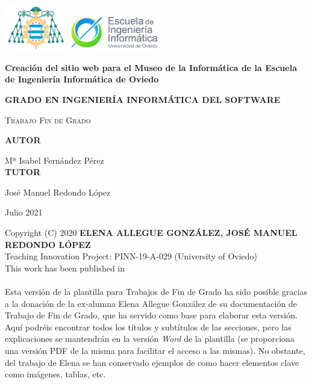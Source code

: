 \documentclass[11pt]{report}
\begin{document}

\hypersetup{pageanchor=false}
\begin{titlepage}
	\centering
	\includegraphics[width=0.2\textwidth]{EscudoUniovi}
	\hspace{3 cm}
	\includegraphics[width=0.3\textwidth]{EscudoEscuela}
	\par\vspace{1cm}
	
	\vspace{1.5cm}
	{\huge\bfseries Creación del sitio web para el Museo de la Informática de la Escuela de Ingeniería Informática de Oviedo\par}
	\vspace{2cm}
	{\large \textbf{GRADO EN INGENIERÍA INFORMÁTICA DEL SOFTWARE} \par}
	\vspace{1cm}
	{\scshape\Large Trabajo Fin de Grado\par}
   	
  \vspace{2cm}
	\textbf{AUTOR}\par
	 Mª Isabel Fernández Pérez \\
	\vspace{1.5cm}
	\textbf{TUTOR}\par
	José Manuel Redondo López
	\vfill
	
	{\large Julio 2021 \par}
\end{titlepage}


\newpage
Copyright (C) 2020 \textbf{ELENA ALLEGUE GONZÁLEZ, JOSÉ MANUEL REDONDO LÓPEZ} \\
Teaching Innovation Project: PINN-19-A-029 (University of Oviedo)\\
This work has been published in \cite{RedondoPlantillasRG19} \cite{RedondoUCO20}\\
\\
Esta versión de la plantilla para Trabajos de Fin de Grado ha sido posible gracias a la donación de la ex-alumna Elena Allegue González de su documentación de Trabajo de Fin de Grado, que ha servido como base para elaborar esta versión. Aquí podréis encontrar todos los títulos y subtítulos de las secciones, pero las explicaciones se mantendrán en la versión \textit{Word} de la plantilla (se proporciona una versión PDF de la misma para facilitar el acceso a las mismas). No obstante, del trabajo de Elena se han conservado ejemplos de como hacer elementos clave como imágenes, tablas, etc.
\end{document}
